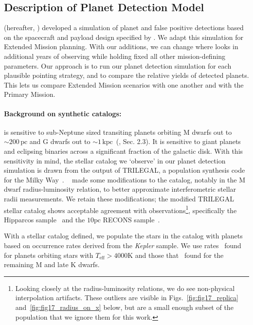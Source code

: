 \subsection{Description of Planet Detection Model}
\label{sec:planet_detection_model}

\citet{Sullivan_2015} (hereafter, )
developed a simulation of \tesss planet and false positive detections
based on the spacecraft and payload design specified by
\citet{ricker_transiting_2014}.  We adapt this simulation for Extended
Mission planning.  With our additions, we can change where \tess looks
in additional years of observing while holding fixed all other
mission-defining parameters.  Our approach is to run our planet
detection simulation for each plausible pointing strategy, and to
compare the relative yields of detected planets.  This lets us compare
Extended Mission scenarios with one another and with the Primary
Mission.

\paragraph{Background on synthetic catalogs:}

\tess is sensitive to sub-Neptune sized transiting planets orbiting M
dwarfs out to $\sim\!200\,\text{pc}$ and G dwarfs out to
$\sim\!1\,\text{kpc}$~(, Sec. 2.3).  It is
sensitive to giant planets and eclipsing binaries across a significant
fraction of the galactic disk.  With this sensitivity in mind, the
stellar catalog we `observe' in our planet detection simulation is
drawn from the output of TRILEGAL, a population synthesis code for the
Milky Way~\citep{girardi_star_2005}.  ~ made
some modifications to the catalog, notably in the M dwarf
radius-luminosity relation, to better approximate interferometric
stellar radii measurements.  We retain these modifications; the modified
TRILEGAL stellar catalog shows acceptable agreement with
observations\footnote{Looking closely at the radius-luminosity
  relations, we do see non-physical interpolation artifacts. These
  outliers are visible in Figs.~\ref{fig:fig17_replica}
  and~\ref{fig:fig17_radius_on_x} below, but are a small enough subset
  of the population that we ignore them for this work.}, specifically
the Hipparcos
sample~\citep{perryman_hipparcos_1997,van_leeuwen_validation_2007} and
the $10\text{pc}$ RECONS sample~\citep{henry_solar_2006}.

With a stellar catalog defined, we populate the stars in the catalog
with planets based on occurrence rates derived from the
\textit{Kepler} sample.  We use rates~\citet{fressin_false_2013} found
for planets orbiting stars with $T_\text{eff} > 4000\text{K}$ and
those that~\citet{dressing_occurrence_2015} found for the remaining M
and late K dwarfs.

